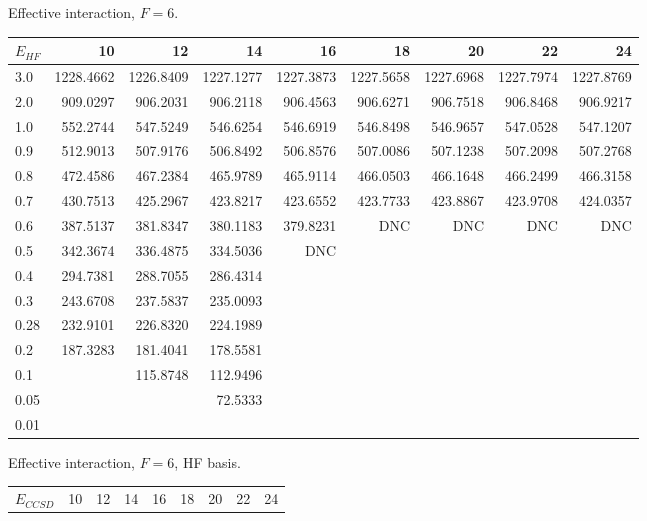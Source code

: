 \begin{landscape}
\begin{table}
\begin{center}
Effective interaction, $F=6$.\\
\begin{tabular}{l|rrrrrrrr}
\hline 
$E_{HF}$ & 10 & 12 & 14 & 16 & 18 & 20 & 22 & 24 \\
\hline \hline
3.0 & 1228.4662 & 1226.8409 & 1227.1277 & 1227.3873 & 1227.5658 & 1227.6968 & 1227.7974 & 1227.8769 \\ 
2.0 &  909.0297 &  906.2031 &  906.2118 &  906.4563 &  906.6271 &  906.7518 &  906.8468 &  906.9217 \\ 
1.0 &  552.2744 &  547.5249 &  546.6254 &  546.6919 &  546.8498 &  546.9657 &  547.0528 &  547.1207 \\ 
0.9 &  512.9013 &  507.9176 &  506.8492 &  506.8576 &  507.0086 &  507.1238 &  507.2098 &  507.2768 \\ 
0.8 &  472.4586 &  467.2384 &  465.9789 &  465.9114 &  466.0503 &  466.1648 &  466.2499 &  466.3158 \\ 
0.7 &  430.7513 &  425.2967 &  423.8217 &  423.6552 &  423.7733 &  423.8867 &  423.9708 &  424.0357 \\ 
0.6 &  387.5137 &  381.8347 &  380.1183 &  379.8231 &       DNC &       DNC &       DNC &       DNC \\ 
0.5 &  342.3674 &  336.4875 &  334.5036 &       DNC  \\ 
0.4 &  294.7381 &  288.7055 &  286.4314  \\ 
0.3 &  243.6708 &  237.5837 &  235.0093  \\ 
0.28 & 232.9101 &  226.8320 &  224.1989  \\ 
0.2 &  187.3283 &  181.4041 &  178.5581  \\ 
0.1 &           &  115.8748 &  112.9496  \\ 
0.05 &          &           &   72.5333  \\ 
0.01 & \\
\hline \hline
\end{tabular}
\end{center}
\end{table}
\begin{table}
\begin{center}
Effective interaction, $F=6$, HF basis.\\
\begin{tabular}{l|rrrrrrrr}
\hline 
$E_{CCSD}$ & 10 & 12 & 14 & 16 & 18 & 20 & 22 & 24 \\

\end{tabular}
\end{center}
\end{table}
\end{landscape}

